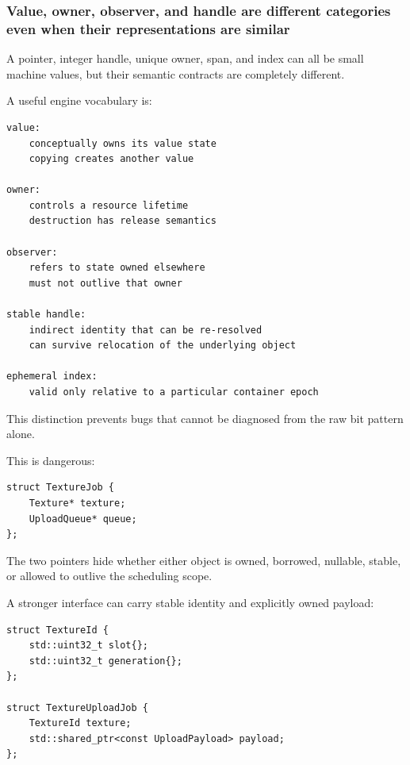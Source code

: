 \subsubsection{Value, owner, observer, and handle are different categories even when their representations are similar}\label{01-foundations-i-ch005-value-owner-observer-and-handle-are-different-categories-even-when-their-representations-are-similar}

\hypertarget{01-foundations-i-ch005-value-owner-observer-and-handle-are-different-categories-even-when-their-representations-are-similar}{}

A pointer, integer handle, unique owner, span, and index can all be small machine values, but their semantic contracts are completely different.

A useful engine vocabulary is:

\begin{verbatim}
value:
    conceptually owns its value state
    copying creates another value

owner:
    controls a resource lifetime
    destruction has release semantics

observer:
    refers to state owned elsewhere
    must not outlive that owner

stable handle:
    indirect identity that can be re-resolved
    can survive relocation of the underlying object

ephemeral index:
    valid only relative to a particular container epoch
\end{verbatim}

This distinction prevents bugs that cannot be diagnosed from the raw bit pattern alone.

This is dangerous:

\begin{verbatim}
struct TextureJob {
    Texture* texture;
    UploadQueue* queue;
};
\end{verbatim}

The two pointers hide whether either object is owned, borrowed, nullable, stable, or allowed to outlive the scheduling scope.

A stronger interface can carry stable identity and explicitly owned payload:

\begin{verbatim}
struct TextureId {
    std::uint32_t slot{};
    std::uint32_t generation{};
};

struct TextureUploadJob {
    TextureId texture;
    std::shared_ptr<const UploadPayload> payload;
};
\end{verbatim}

